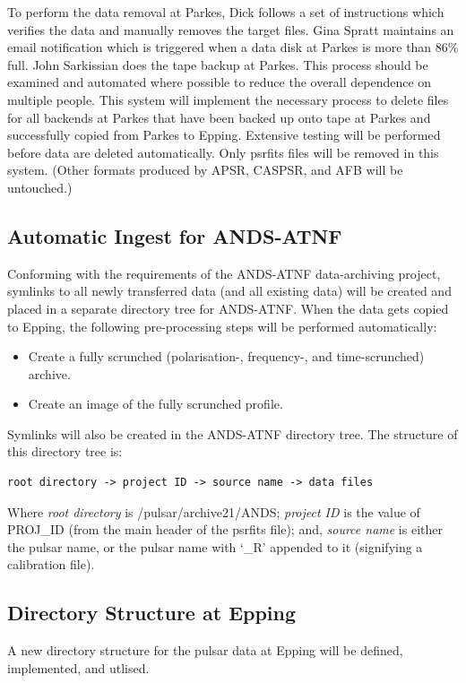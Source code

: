 \documentclass[a4paper,11pt]{article}
\begin{document}
To perform the data removal at Parkes, Dick follows a set of instructions which verifies the data and manually removes the target files. Gina Spratt maintains an email notification which is triggered when a data disk at Parkes is more than 86\% full. John Sarkissian does the tape backup at Parkes. This process should be examined and automated where possible to reduce the overall dependence on multiple people. This system will implement the necessary process to delete files for all backends at Parkes that have been backed up onto tape at Parkes and successfully copied from Parkes to Epping. Extensive testing will be performed before data are deleted automatically. Only psrfits files will be removed in this system. (Other formats produced by APSR, CASPSR, and AFB will be untouched.)

\subsection{Automatic Ingest for ANDS-ATNF}
Conforming with the requirements of the ANDS-ATNF data-archiving project, symlinks to all newly transferred data (and all existing data) will be created and placed in a separate directory tree for ANDS-ATNF. When the data gets copied to Epping, the following pre-processing steps will be performed automatically:

\begin{itemize}
\item Create a fully scrunched (polarisation-, frequency-, and time-scrunched) archive.
\item Create an image of the fully scrunched profile.
\end{itemize}

Symlinks will also be created in the ANDS-ATNF directory tree. The structure of this directory tree is:

\begin{verbatim}
root directory -> project ID -> source name -> data files
\end{verbatim}

Where \emph{root directory} is /pulsar/archive21/ANDS; \emph{project ID} is the value of PROJ\_ID (from the main header of the psrfits file); and, \emph{source name} is either the pulsar name, or the pulsar name with `\_R' appended to it (signifying a calibration file).

\subsection{Directory Structure at Epping}
A new directory structure for the pulsar data at Epping will be defined, implemented, and utlised.
\end{document}
